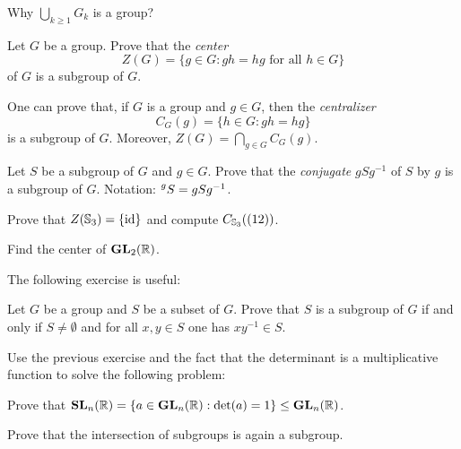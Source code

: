 Why $\bigcup_{k\geq1}G_k$ is a group? 

\begin{exercise}
\label{xca:center}
        Let $G$ be a group. Prove that the \emph{center} 
        \[
                Z(G)=\{g\in G:gh=hg\text{ for all $h\in G$}\}
        \]
        of $G$ is a subgroup of $G$. 
\end{exercise}

One can prove that, if $G$ is a group and $g\in G$, then 
the \emph{centralizer} 
\[
C_G(g)=\{h\in G:gh=hg\}
\]
is a subgroup of $G$. Moreover, 
$Z(G)=\bigcap_{g\in G}C_G(g)$. 

\begin{exercise}
        \label{xca:conjugate}
        Let $S$ be a subgroup of $G$ and $g\in G$. Prove that
        the \emph{conjugate} $gSg^{-1}$
        of $S$ by $g$ is a subgroup of $G$. 
        Notation: $\prescript{g}{}S=gSg^{-1}$.
\end{exercise}


\begin{exercise}
\label{xca:center_S3}
        Prove that $Z(\mathbb{S}_3)=\{\operatorname{id}\}$ and compute $C_{\mathbb{S}_3}((12))$.
\end{exercise}

\begin{exercise}
\label{xca:center_2x2}
    Find the center of $\mathbf{GL}_2(\mathbb{R})$.
\end{exercise}

The following exercise is useful: 

\begin{exercise}
\label{xca:subgroup}
        Let $G$ be a group and $S$ be a subset of $G$. 
        Prove that $S$ is a subgroup of $G$ if and only if 
        $S\ne\emptyset$ and for all $x,y\in S$ one has
        $xy^{-1}\in S$.
\end{exercise}

Use the previous exercise and
the fact that the determinant is a multiplicative function
to solve the following problem:

\begin{exercise}
\label{xca:SL_subgroup}
Prove that $\mathbf{SL}_n(\mathbb{R})=\{a\in\mathbf{GL}_n(\mathbb{R}):\det(a)=1\}\leq\mathbf{GL}_n(\mathbb{R})$. 
\end{exercise}

\begin{exercise}
\label{xca:intersection}
    Prove that the intersection of subgroups is again a subgroup.
\end{exercise}

